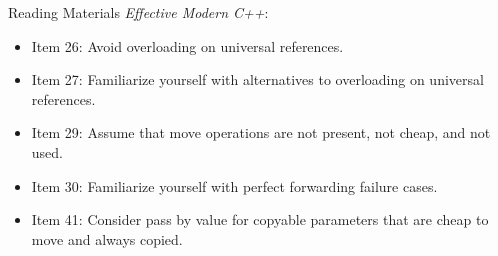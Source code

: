 \documentclass{beamer}
\begin{document}
\begin{frame}{Reading Materials}
  \textit{Effective Modern C++}:
  \begin{itemize}
    \item Item 26: Avoid overloading on universal references.
    \item Item 27: Familiarize yourself with alternatives to overloading on universal references.
    \item Item 29: Assume that move operations are not present, not cheap, and not used.
    \item Item 30: Familiarize yourself with perfect forwarding failure cases.
    \item Item 41: Consider pass by value for copyable parameters that are cheap to move and always copied.
  \end{itemize}
\end{frame}
\end{document}
